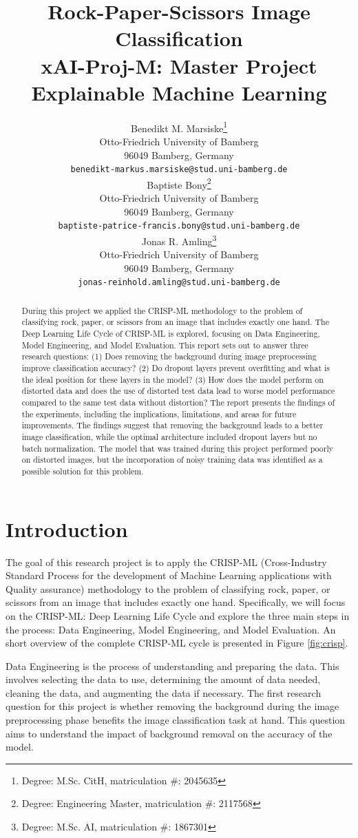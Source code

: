 \documentclass[a4paper]{article}
\title{ Rock-Paper-Scissors Image Classification\\ {\large xAI-Proj-M: Master Project Explainable Machine Learning }}
\author{%
  Benedikt M. Marsiske\thanks{Degree: M.Sc. CitH, matriculation \#: 2045635} \\
  Otto-Friedrich University of Bamberg\\
  96049 Bamberg, Germany\\
  \texttt{benedikt-markus.marsiske@stud.uni-bamberg.de}\\
   \And
   Baptiste Bony\thanks{Degree: Engineering Master, matriculation \#: 2117568}\\
   Otto-Friedrich University of Bamberg\\
   96049 Bamberg, Germany\\
   \texttt{baptiste-patrice-francis.bony@stud.uni-bamberg.de} \\
   \And
   Jonas R. Amling\thanks{Degree: M.Sc. AI, matriculation \#: 1867301}\\
   Otto-Friedrich University of Bamberg\\
   96049 Bamberg, Germany\\
   \texttt{jonas-reinhold.amling@stud.uni-bamberg.de} \\
}
\begin{document}
\maketitle
\def\va{{\bm{a}}}

\begin{abstract}
 During this project we applied the CRISP-ML methodology to the problem of classifying rock, paper, or scissors from an image that includes exactly one hand. The Deep Learning Life Cycle of CRISP-ML is explored, focusing on Data Engineering, Model Engineering, and Model Evaluation. This report sets out to answer three research questions: (1) Does removing the background during image preprocessing improve classification accuracy? (2) Do dropout layers prevent overfitting and what is the ideal position for these layers in the model? (3) How does the model perform on distorted data and does the use of distorted test data lead to worse model performance compared to the same test data without distortion? The report presents the findings of the experiments, including the implications, limitations, and areas for future improvements. The findings suggest that removing the background leads to a better image classification, while the optimal architecture included dropout layers but no batch normalization. The model that was trained during this project performed poorly on distorted images, but the incorporation of noisy training data was identified as a possible solution for this problem.
\end{abstract}


\section{Introduction}

The goal of this research project is to apply the CRISP-ML (Cross-Industry Standard Process for the development of Machine Learning applications with Quality assurance) methodology \citep{crisp} to the problem of classifying rock, paper, or scissors from an image that includes exactly one hand. Specifically, we will focus on the CRISP-ML: Deep Learning Life Cycle and explore the three main steps in the process: Data Engineering, Model Engineering, and Model Evaluation. An short overview of the complete CRISP-ML cycle is presented in Figure \ref{fig:crisp}.

Data Engineering is the process of understanding and preparing the data. This involves selecting the data to use, determining the amount of data needed, cleaning the data, and augmenting the data if necessary. The first research question for this project is whether removing the background during the image preprocessing phase benefits the image classification task at hand. This question aims to understand the impact of background removal on the accuracy of the model.
\end{document}
